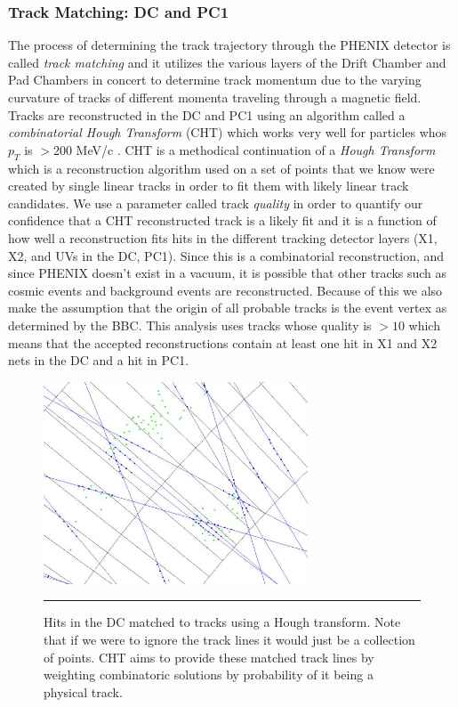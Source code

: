 \subsubsection{Track Matching: DC and PC1}
The process of determining the track trajectory through the PHENIX detector is called \textit{track matching} and it utilizes the various layers of the Drift Chamber and Pad Chambers in concert to determine track momentum due to the varying curvature of tracks of different momenta traveling through a magnetic field. Tracks are reconstructed in the DC and PC1 using an algorithm called a \textit{combinatorial Hough Transform} (CHT) which works very well for particles whos $p_T$ is $>$200 MeV/c \citep{Mitchell:2002wu}. CHT is a methodical continuation of a \textit{Hough Transform} which is a reconstruction algorithm used on a set of points that we know were created by single linear tracks in order to fit them with likely linear track candidates\citep{OHLSSON199277}. We use a parameter called track \textit{quality} in order to quantify our confidence that a CHT reconstructed track is a likely fit and it is a function of how well a reconstruction fits hits in the different tracking detector layers (X1, X2, and UVs in the DC, PC1). Since this is a combinatorial reconstruction, and since PHENIX doesn't exist in a vacuum, it is possible that other tracks such as cosmic events and background events are reconstructed.  Because of this we also make the assumption that the origin of all probable tracks is the event vertex as determined by the BBC. This analysis uses tracks whose quality is $>10$ which means that the accepted reconstructions contain at least one hit in X1 and X2 nets in the DC and a hit in PC1.

\begin{figure}[htbp!]
  \centering
    \includegraphics[width=0.7\textwidth]{Figures/houghtransformcartoon.JPG}
    \rule{35em}{0.5pt}
  \caption[Hits in the DC matched to tracks using a Hough transform]{Hits in the DC matched to tracks using a Hough transform. Note that if we were to ignore the track lines it would just be a collection of points. CHT aims to provide these matched track lines by weighting combinatoric solutions by probability of it being a physical track.}
  \label{fig:houghtransform}
\end{figure}

